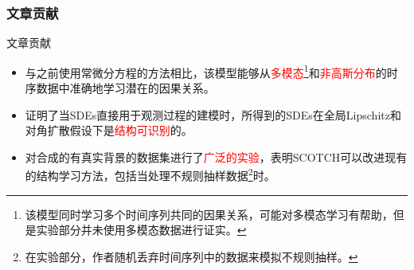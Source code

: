 \documentclass{beamer}
\begin{document}
\begin{frame}
\frametitle{文章贡献}
\begin{block}{文章贡献}
\begin{itemize}
    \item 与之前使用常微分方程的方法相比，该模型能够从\textcolor{red}{多模态\footnote[frame]{该模型同时学习多个时间序列共同的因果关系，可能对多模态学习有帮助，但是实验部分并未使用多模态数据进行证实。}}和\textcolor{red}{非高斯分布}的时序数据中准确地学习潜在的因果关系。
    \item 证明了当SDEs直接用于观测过程的建模时，所得到的SDEs在全局Lipschitz和对角扩散假设下是\textcolor{red}{结构可识别}的。
    \item 对合成的有真实背景的数据集进行了\textcolor{red}{广泛的实验}，表明SCOTCH可以改进现有的结构学习方法，包括当处理不规则抽样数据\footnote[frame]{在实验部分，作者随机丢弃时间序列中的数据来模拟不规则抽样。}时。
\end{itemize}
\end{block}
\end{frame}
\end{document}
